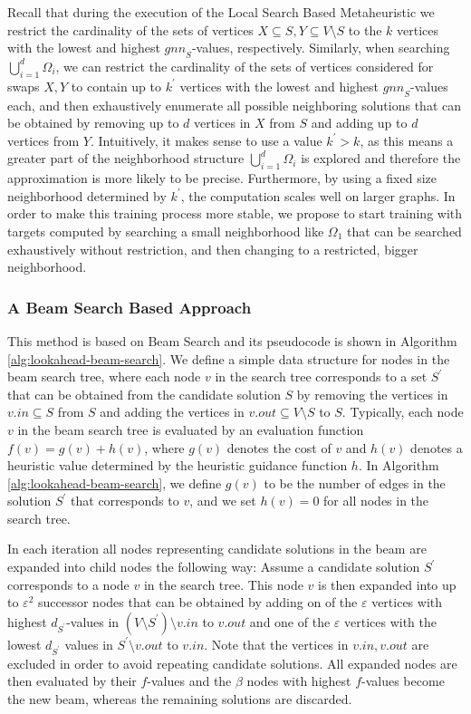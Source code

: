 \documentclass[draft,final]{vutinfth} %
\begin{document}
Recall that during the execution of the Local Search Based Metaheuristic we restrict the cardinality of the sets of vertices $X \subseteq S, Y \subseteq V \setminus S$ to the $k$ vertices with the lowest and highest $\mathit{gnn}_S$-values, respectively. Similarly, when searching $\bigcup_{i=1}^d \Omega_i$, we can restrict the cardinality of the sets of vertices considered for swaps $X, Y$ to contain up to $k^\prime$ vertices with the lowest and highest $\mathit{gnn}_S$-values each, and then exhaustively enumerate all possible neighboring solutions that can be obtained by removing up to $d$ vertices in $X$ from $S$ and adding up to $d$ vertices from $Y$. Intuitively, it makes sense to use a value $k^\prime > k$, as this means a greater part of the neighborhood structure $\bigcup_{i=1}^d \Omega_i$ is explored and therefore the approximation is more likely to be precise. 
Furthermore, by using a fixed size neighborhood determined by $k^\prime$, the computation scales well on larger graphs. 
In order to make this training process more stable, we propose to start training with targets computed by searching a small neighborhood like $\Omega_1$ that can be searched exhaustively without restriction, and then changing to a restricted, bigger neighborhood.  

\subsubsection{A Beam Search Based Approach}

 This method is based on Beam Search and its pseudocode is shown in Algorithm \ref{alg:lookahead-beam-search}.
 We define a simple data structure for nodes in the beam search tree, where each node $v$ in the search tree corresponds to a set $S^\prime$ that can be obtained from the candidate solution $S$ by removing the vertices in $v.in \subseteq S$ from $S$ and adding the vertices in $v.out \subseteq V\setminus S$ to $S$. 
 Typically, each node $v$ in the beam search tree is evaluated by an evaluation function $f(v) = g(v) + h(v)$, where $g(v)$ denotes the cost of $v$ and $h(v)$ denotes a heuristic value determined by the heuristic guidance function $h$. In Algorithm \ref{alg:lookahead-beam-search}, we define $g(v)$ to be the number of edges in the solution $S^\prime$ that corresponds to $v$, and we set $h(v) = 0$ for all nodes in the search tree. 

In each iteration all nodes representing candidate solutions in the beam are expanded into child nodes the following way: Assume a candidate solution $S^\prime$ corresponds to a node $v$ in the search tree. This node $v$ is then expanded into up to $\varepsilon^2$ successor nodes that can be obtained by adding on of the $\varepsilon$ vertices with highest $d_{S^\prime}$-values in $(V \setminus S^\prime) \setminus v.\mathit{in}$ to $v.out$ and one of the $\varepsilon$ vertices with the lowest $d_{S^\prime}$ values in $S^\prime \setminus v.\mathit{out}$ to $v.in$. Note that the vertices in $v.in, v.out$ are excluded in order to avoid repeating candidate solutions. All expanded nodes are then evaluated by their $f$-values and the $\beta$ nodes with highest $f$-values become the new beam, whereas the remaining solutions are discarded. 
\end{document}
